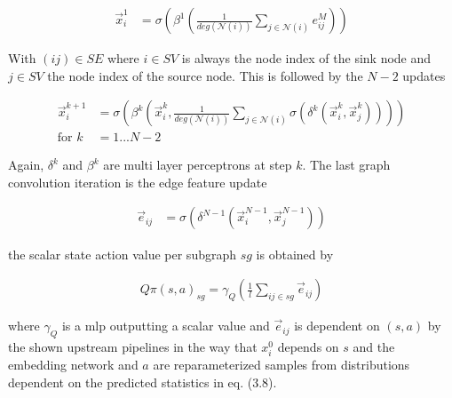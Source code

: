 \begin{align}
\vec{x}_i^1 &= \sigma \left( \beta^1 \left(\frac{1}{deg(\mathcal{N}(i))} \sum_{j \in \mathcal{N}(i)}  e_{ij}^M\right)\right)
\end{align}

With $(ij)\in SE$ where $i \in SV$ is always the node index of the sink node and $j \in SV$ the node index of the source node.
This is followed by the $N-2$ updates

\begin{align}
\vec{x}_i^{k+1} &= \sigma \left( \beta^k \left(\vec{x}_i^k, \frac{1}{deg(\mathcal{N}(i))} \sum_{j \in \mathcal{N}(i)}  \sigma \left( \delta^k \left(\vec{x}_i^k, \vec{x}_j^k\right)\right) \right)\right)\\
\text{for }k&=1...N-2
\end{align}

Again, $\delta^k$ and $\beta^k$ are multi layer perceptrons at step $k$. The last graph convolution iteration is the edge feature update

\begin{align}
\vec{e}_{ij} &= \sigma \left( \delta^{N-1} \left(\vec{x}_i^{N-1}, \vec{x}_j^{N-1} \right)\right)
\end{align}

the scalar state action value per subgraph $sg$ is obtained by

\begin{align}
	Q\pi(s, a)_{sg} = \gamma_{Q}\left( \frac{1}{l} \sum_{ij\in sg} \vec{e}_{ij} \right)
\end{align}

where $\gamma_{Q}$ is a mlp outputting a scalar value and $\vec{e}_{ij}$ is dependent on $(s, a)$ by the shown upstream pipelines in the way that $x^0_i$ depends on $s$ and the embedding network and $a$ are reparameterized samples from distributions dependent on the predicted statistics in eq. (3.8).
